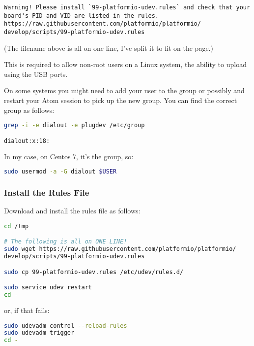 \begin{lstlisting}
Warning! Please install `99-platformio-udev.rules` and check that your 
board's PID and VID are listed in the rules.
https://raw.githubusercontent.com/platformio/platformio/
develop/scripts/99-platformio-udev.rules
\end{lstlisting}

(The filename above is all on one line, I've split it to fit on the page.)

This is required to allow non-root users on a Linux system, the ability
to upload using the USB ports. 

On some systems you might need to add your 
user to the group  or possibly  and 
restart your Atom session to pick up the new group. You can find the correct group
as follows:

\begin{lstlisting}[language=bash]
grep -i -e dialout -e plugdev /etc/group

dialout:x:18:
\end{lstlisting}

In my case, on Centos 7, it's the  group, so:

\begin{lstlisting}[language=bash]
sudo usermod -a -G dialout $USER
\end{lstlisting}


\subsubsection{Install the Rules File}\label{install-the-rules-file}

Download and install the rules file as follows:

\begin{lstlisting}[language=bash]
cd /tmp

# The following is all on ONE LINE!
sudo wget https://raw.githubusercontent.com/platformio/platformio/
develop/scripts/99-platformio-udev.rules

sudo cp 99-platformio-udev.rules /etc/udev/rules.d/

sudo service udev restart
cd -
\end{lstlisting}

or, if that fails:

\begin{lstlisting}[language=bash]
sudo udevadm control --reload-rules
sudo udevadm trigger
cd -
\end{lstlisting}


